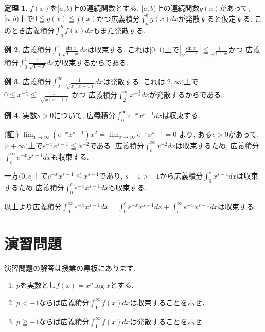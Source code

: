 \documentclass[dvipdfmx,a4paper,11pt]{article}
\theoremstyle{definition}
\newtheorem{thm}{定理}
\newtheorem{exa}[thm]{例}
\begin{document}
   \begin{tcolorbox}[
    colback = white,
    colframe = green!35!black,
    fonttitle = \bfseries,
    breakable = true]
    \begin{thm}
$f(x)$を$[a,b)$上の連続関数とする.
$[a,b)$上の連続関数$g(x)$があって, $[a , b)$上で$0 \leqq g(x) \leqq f(x)$かつ広義積分$\int_{a}^{b} g(x) dx$が発散すると仮定する.
このとき広義積分$\int_{a}^{b} f(x) dx$もまた発散する.
 \end{thm}
 \end{tcolorbox}
 
 \begin{exa}
広義積分$\int_{0}^{1} \frac{\sin x}{\sqrt{1-x}}dx $は収束する.
これは$[0, 1)$上で$|\frac{\sin x}{\sqrt{1-x}}| \leqq \frac{1}{\sqrt{1-x}}$かつ
広義積分$\int_{0}^1 \frac{1}{\sqrt{1-x}} dx$が収束するからである.
 \end{exa}
 
  \begin{exa}
広義積分$\int_{2}^{\infty} \frac{1}{\sqrt[3]{x(x-1)}}dx $は発散する.
これは$[2, \infty)$上で
$0 \leqq x^{-\frac{2}{3}}\leqq \frac{1}{\sqrt[3]{x(x-1)}}$
かつ
広義積分$\int_{2}^{\infty} x^{- \frac{2}{3}} dx$が発散するからである.
 \end{exa}

  \begin{exa}
実数$s>0$について, 広義積分$\int_{0}^{\infty} e^{-x}x^{s-1}dx $は収束する.

\hspace{-18pt}(証.)
$\lim_{x \rightarrow \infty} (e^{-x}x^{s-1}) x^{2} = \lim_{x \rightarrow \infty} e^{-x}x^{s+1} =0$
より, ある$c>0$があって, $[c +\infty)$上で$e^{-x} x^{s-1} \leqq x^{-2}$である.
広義積分$\int_{c}^{\infty} x^{-2} dx$は収束するため, 広義積分$\int_{c}^{\infty}e^{-x} x^{s-1}dx$も収束する.

一方$(0 , c]$上で$e^{-x}x^{s-1} \leqq x^{s-1}$であり, $s-1 > -1$から広義積分$\int_{0}^{c} x^{s-1} dx$は収束するため
広義積分$\int_{0}^{c} e^{-x}x^{s-1} dx$も収束する.

以上より広義積分$\int_{0}^{\infty} e^{-x}x^{s-1}dx  =\int_{0}^{c} e^{-x}x^{s-1}dx +\int_{c}^{\infty} e^{-x}x^{s-1}dx  $は収束する.
 \end{exa}



\section{演習問題}
演習問題の解答は授業の黒板にあります.
\begin{enumerate}
\item[] $p$を実数とし$f(x) = x^p \log x$とする.
\item $p< -1$ならば広義積分$\int_{1}^{\infty} f(x) dx$は収束することを示せ．
\item $p\geqq -1$ならば広義積分$\int_{1}^{\infty} f(x) dx$は発散することを示せ.
\end{enumerate}



 
\end{document}
